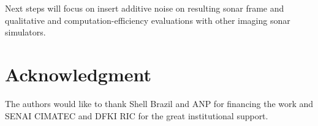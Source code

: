 \documentclass[final,5p,times]{elsarticle}
\begin{document}
Next steps will focus on insert additive noise on resulting sonar frame and qualitative and computation-efficiency evaluations with other imaging sonar simulators.




\section*{Acknowledgment}
%
The authors would like to thank Shell Brazil and ANP for financing the work and SENAI CIMATEC and DFKI RIC for the great institutional support.

\newpage









\end{document}
